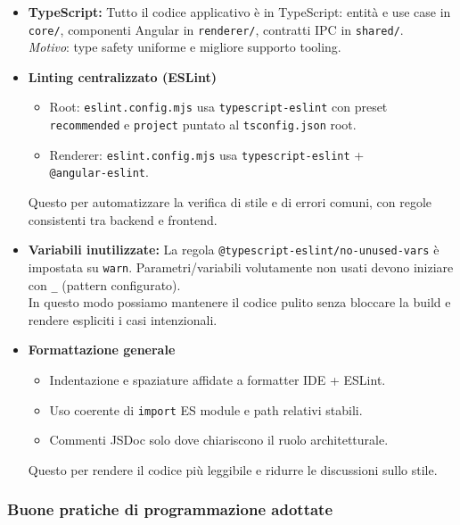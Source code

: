 \documentclass[a4paper,12pt]{article}
\begin{document}
\begin{itemize}
  \item \textbf{TypeScript:} Tutto il codice applicativo è in TypeScript: entità e use case in \texttt{core/}, componenti Angular in \texttt{renderer/}, contratti IPC in \texttt{shared/}. \\
    \textit{Motivo}: type safety uniforme e migliore supporto tooling.

  \item \textbf{Linting centralizzato (ESLint)}
    \begin{itemize}
      \item Root: \texttt{eslint.config.mjs} usa \texttt{typescript-eslint} con preset \\ \texttt{recommended} e \texttt{project} puntato al \texttt{tsconfig.json} root.
      \item Renderer: \texttt{eslint.config.mjs} usa \texttt{typescript-eslint} +  \\ \texttt{@angular-eslint}.
    \end{itemize}
    Questo per automatizzare la verifica di stile e di errori comuni, con regole consistenti tra backend e frontend.

  \item \textbf{Variabili inutilizzate:} La regola \texttt{@typescript-eslint/no-unused-vars} è impostata su \texttt{warn}. Parametri/variabili volutamente non usati devono iniziare con \texttt{\_} (pattern configurato). \\
    In questo modo possiamo mantenere il codice pulito senza bloccare la build e rendere espliciti i casi intenzionali.

  \item \textbf{Formattazione generale}
    \begin{itemize}
      \item Indentazione e spaziature affidate a formatter IDE + ESLint.
      \item Uso coerente di \texttt{import} ES module e path relativi stabili.
      \item Commenti JSDoc solo dove chiariscono il ruolo architetturale.
    \end{itemize}
    Questo per rendere il codice più leggibile e ridurre le discussioni sullo stile.
\end{itemize}

\subsubsection{Buone pratiche di programmazione adottate}
\end{document}
